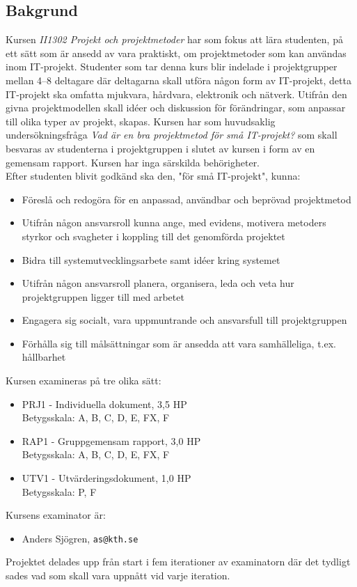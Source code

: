 \documentclass[conference]{IEEEtran}
\begin{document}
\subsection{Bakgrund}\label{Bakgrund}
Kursen \textit{II1302 Projekt och projektmetoder} har som fokus att lära studenten, på ett sätt som är ansedd av vara praktiskt, om projektmetoder som kan användas inom IT-projekt. 
Studenter som tar denna kurs blir indelade i projektgrupper mellan 4–8 deltagare där deltagarna skall utföra någon form av IT-projekt, detta IT-projekt ska omfatta mjukvara, hårdvara, elektronik och nätverk.
Utifrån den givna projektmodellen skall idéer och diskussion för förändringar, som anpassar till olika typer av projekt, skapas.
Kursen har som huvudsaklig undersökningsfråga \textit{Vad är en bra projektmetod för små IT-projekt?} som skall besvaras av studenterna i projektgruppen i slutet av kursen i form av en gemensam rapport.
Kursen har inga särskilda behörigheter.\\
Efter studenten blivit godkänd ska den, "för små IT-projekt", kunna:
\begin{itemize}
    \item Föreslå och redogöra för en anpassad, användbar och beprövad projektmetod
    \item Utifrån någon ansvarsroll kunna ange, med evidens, motivera metoders styrkor och svagheter i koppling till det genomförda projektet
    \item Bidra till systemutvecklingsarbete samt idéer kring systemet
    \item Utifrån någon ansvarsroll planera, organisera, leda och veta hur projektgruppen ligger till med arbetet
    \item Engagera sig socialt, vara uppmuntrande och ansvarsfull till projektgruppen
    \item Förhålla sig till målsättningar som är ansedda att vara samhälleliga, t.ex. hållbarhet
\end{itemize}
Kursen examineras på tre olika sätt:
\begin{itemize}
    \item PRJ1 - Individuella dokument, 3,5 HP\\Betygsskala: A, B, C, D, E, FX, F
    \item RAP1 - Gruppgemensam rapport, 3,0 HP\\Betygsskala: A, B, C, D, E, FX, F
    \item UTV1 - Utvärderingsdokument, 1,0 HP\\Betygsskala: P, F
\end{itemize}
Kursens examinator är:
\begin{itemize}
    \item Anders Sjögren, \texttt{as@kth.se}
\end{itemize}
Projektet delades upp från start i fem iterationer av examinatorn där det tydligt sades vad som skall vara uppnått vid varje iteration.\\
\end{document}
